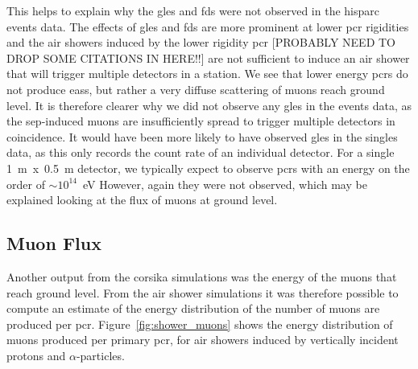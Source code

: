 This helps to explain why the \glspl{gle} and \glspl{fd} were not observed in the \gls{hisparc} events data. The effects of \glspl{gle} and \glspl{fd} are more prominent at lower \gls{pcr} rigidities and the air showers induced by the lower rigidity \gls{pcr} [PROBABLY NEED TO DROP SOME CITATIONS IN HERE!!] are not sufficient to induce an air shower that will trigger multiple detectors in a station. We see that lower energy \glspl{pcr} do not produce \glspl{eas}, but rather a very diffuse scattering of muons reach ground level. It is therefore clearer why we did not observe any \glspl{gle} in the events data, as the \gls{sep}-induced muons are insufficiently spread to trigger multiple detectors in coincidence. It would have been more likely to have observed \glspl{gle} in the singles data, as this only records the count rate of an individual detector. For a single 1~m~x~0.5~m detector, we typically expect to observe \glspl{pcr} with an energy on the order of $\sim 10^{14}$~eV However, again they were not observed, which may be explained looking at the flux of muons at ground level.



\subsection{Muon Flux}\label{sec:CORSIKA_flux}

Another output from the \gls{corsika} simulations was the energy of the muons that reach ground level. From the air shower simulations it was therefore possible to compute an estimate of the energy distribution of the number of muons are produced per \gls{pcr}. Figure~\ref{fig:shower_muons} shows the energy distribution of muons produced per primary \gls{pcr}, for air showers induced by vertically incident protons and $\alpha$-particles.


